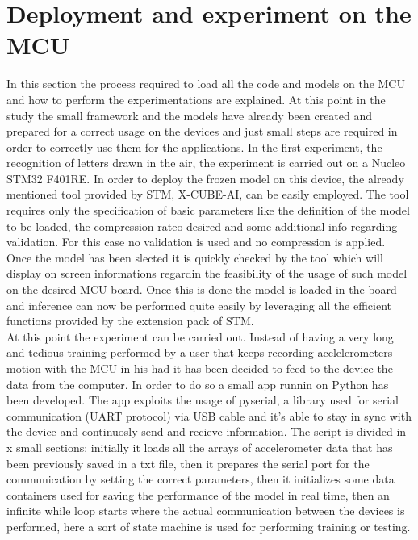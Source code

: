 \documentclass[12pt]{report}
\begin{document}
\section{Deployment and experiment on the MCU}
In this section the process required to load all the code and models on the MCU and how to perform the experimentations are explained. At this point in the study the small framework and the models have already been created and prepared for a correct usage on the devices and just small steps are required in order to correctly use them for the applications. \bigskip
In the first experiment, the recognition of letters drawn in the air, the experiment is carried out on a Nucleo STM32 F401RE. In order to deploy the frozen model on this device, the already mentioned tool provided by STM, X-CUBE-AI, can be easily employed. The tool requires only the specification of basic parameters like the definition of the model to be loaded, the compression rateo desired and some additional info regarding validation. For this case no validation is used and no compression is applied. Once the model has been slected it is quickly checked by the tool which will display on screen informations regardin the feasibility of the usage of such model on the desired MCU board. Once this is done the model is loaded in the board and inference can now be performed quite easily by leveraging all the efficient functions provided by the extension pack of STM. \\
At this point the experiment can be carried out. Instead of having a very long and tedious training performed by a user that keeps recording acclelerometers motion with the MCU in his had it has been decided to feed to the device the data from the computer. In order to do so a small app runnin on Python has been developed. The app exploits the usage of pyserial, a library used for serial communication (UART protocol) via USB cable and it's able to stay in sync with the device and continuosly send and recieve information. 
The script is divided in x small sections: initially it loads all the arrays of accelerometer data that has been previously saved in a txt file, then it prepares the serial port for the communication by setting the correct parameters, then it initializes some data containers used for saving the performance of the model in real time, then an infinite while loop starts where the actual communication between the devices is performed, here a sort of state machine is used for performing training or testing. 
\end{document}
